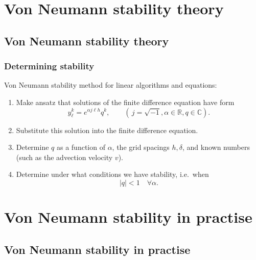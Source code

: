 \documentclass{beamer}
\begin{document}
\section{Von Neumann stability theory}

\subsection{Von Neumann stability theory}

\begin{frame}
  \frametitle{Determining stability}

  Von Neumann stability method for linear algorithms and equations:
  \begin{enumerate}
  \item<2-> Make ansatz that solutions of the finite difference
    equation have form
    \begin{equation*}
      y_{\ell}^k =  e^{\alpha j \ell h} q^k, \qquad (\, j = \sqrt{-1}, \alpha \in {\mathbb R}, q \in {\mathbb C} ).
    \end{equation*}
  \item<3-> Substitute this solution into the finite difference
    equation.
  \item<4-> Determine $q$ as a function of $\alpha$, the grid spacings
    $h,\delta$, and known numbers (such as the advection velocity
    $v$).
  \item<5-> Determine under what conditions we have stability, i.e.\ when
    \begin{equation*}
      |q| < 1 \quad \forall \alpha.
    \end{equation*}
  \end{enumerate}

\end{frame}


\section{Von Neumann stability in practise}


\subsection{Von Neumann stability in practise}
\end{document}
